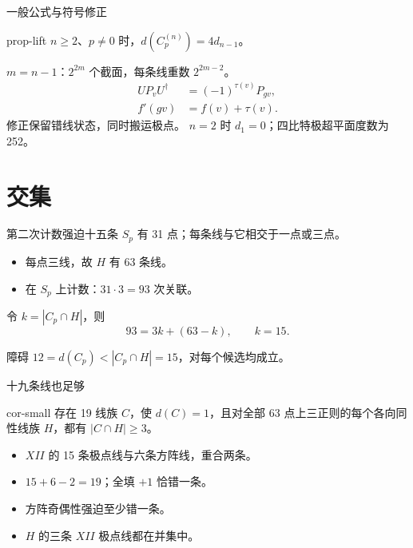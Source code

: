 \documentclass{beamer}
\begin{document}
\begin{frame}{一般公式与符号修正}
\begin{bookresult}{prop-lift}
$n\ge2$、$p\ne0$ 时，$d(C_p^{(n)})=4d_{n-1}$。
\end{bookresult}
$m=n-1$：$2^{2m}$ 个截面，每条线重数 $2^{2m-2}$。
\[
\begin{aligned}
UP_vU^\dagger&=(-1)^{\tau(v)}P_{gv},\\
f'(gv)&=f(v)+\tau(v).
\end{aligned}
\]
修正保留错线状态，同时搬运极点。
$n=2$ 时 $d_1=0$；四比特极超平面度数为 252。
\end{frame}
\section{交集}
\begin{frame}{第二次计数强迫十五条}
$S_p$ 有 31 点；每条线与它相交于一点或三点。
\begin{itemize}
\item 每点三线，故 $H$ 有 63 条线。
\item 在 $S_p$ 上计数：$31\cdot3=93$ 次关联。
\end{itemize}
令 $k=|C_p\cap H|$，则
\[93=3k+(63-k),\qquad k=15.\]
\begin{block}{障碍}
$12=d(C_p)<|C_p\cap H|=15$，对每个候选均成立。
\end{block}
\end{frame}
\begin{frame}{十九条线也足够}
\begin{bookresult}{cor-small}
存在 19 线族 $C$，使 $d(C)=1$，且对全部 63 点上三正则的每个各向同性线族 $H$，都有 $|C\cap H|\ge3$。
\end{bookresult}
\begin{itemize}
\item $XII$ 的 15 条极点线与六条方阵线，重合两条。
\item $15+6-2=19$；全填 $+1$ 恰错一条。
\item 方阵奇偶性强迫至少错一条。
\item $H$ 的三条 $XII$ 极点线都在并集中。
\end{itemize}
\end{frame}
\end{document}
